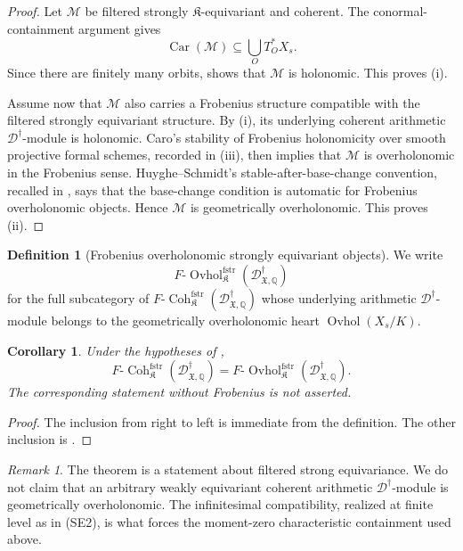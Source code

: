 \documentclass[11pt]{amsart}
\theoremstyle{plain}
\newtheorem{corollary}{Corollary}[section]
\theoremstyle{definition}
\newtheorem{definition}{Definition}[section]
\theoremstyle{remark}
\newtheorem{remark}{Remark}[section]
\newcommand{\Ovhol}{\operatorname{Ovhol}}
\newcommand{\Coh}{\operatorname{Coh}}
\newcommand{\Car}{\operatorname{Car}}
\newcommand{\fstr}{\mathrm{fstr}}
\begin{document}
\begin{proof}
Let \(\mathcal M\) be filtered strongly \(\mathfrak K\)-equivariant and coherent.
The conormal-containment argument gives
\[
  \Car(\mathcal M)\subseteq \bigcup_O T^*_OX_s.
\]
Since there are finitely many orbits, 
shows that \(\mathcal M\) is holonomic.  This proves \textup{(i)}.

Assume now that \(\mathcal M\) also carries a Frobenius structure compatible
with the filtered strongly equivariant structure.  By \textup{(i)}, its
underlying coherent arithmetic \(\mathscr D^\dagger\)-module is holonomic.
Caro's stability of Frobenius holonomicity over smooth projective formal schemes, recorded in
\textup{(iii)}, then implies that \(\mathcal M\) is
overholonomic in the Frobenius sense.  Huyghe--Schmidt's stable-after-base-change
convention, recalled in , says that the base-change
condition is automatic for Frobenius overholonomic objects.  Hence
\(\mathcal M\) is geometrically overholonomic.  This proves \textup{(ii)}.
\end{proof}

\begin{definition}[Frobenius overholonomic strongly equivariant objects]
\label{def:ovhol-fstr}
We write
\[
  F\text{-}\Ovhol^{\fstr}_{\mathfrak K}
  (\mathscr D^\dagger_{\mathfrak X,\mathbb Q})
\]
for the full subcategory of
\(F\text{-}\Coh^{\fstr}_{\mathfrak K}(\mathscr D^\dagger_{\mathfrak X,\mathbb Q})\)
whose underlying arithmetic \(\mathscr D^\dagger\)-module belongs to the
geometrically overholonomic heart \(\Ovhol(X_s/K)\).
\end{definition}

\begin{corollary}
\label{cor:coh-equals-ovhol}
Under the hypotheses of ,
\[
  F\text{-}\Coh^{\fstr}_{\mathfrak K}
  (\mathscr D^\dagger_{\mathfrak X,\mathbb Q})
  =
  F\text{-}\Ovhol^{\fstr}_{\mathfrak K}
  (\mathscr D^\dagger_{\mathfrak X,\mathbb Q}).
\]
The corresponding statement without Frobenius is not asserted.
\end{corollary}

\begin{proof}
The inclusion from right to left is immediate from the definition.  The other
inclusion is .
\end{proof}

\begin{remark}
\label{rem:regularity-strong-not-weak}
The theorem is a statement about filtered strong equivariance.  We do not claim
that an arbitrary weakly equivariant coherent arithmetic
\(\mathscr D^\dagger\)-module is geometrically overholonomic.  The infinitesimal
compatibility, realized at finite level as in \textup{(SE2)}, is what forces the
moment-zero characteristic containment used above.
\end{remark}
\end{document}
